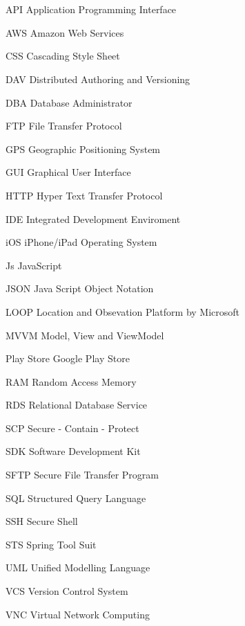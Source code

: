 \newpage
\chapter*{\abbreviationName}
\vspace{-0.3em}


\begin{abbrv}
\item[API]					Application Programming Interface
\item[AWS]					Amazon Web Services
\item[CSS]					Cascading Style Sheet
\item[DAV]					Distributed Authoring and Versioning
\item[DBA]					Database Administrator
\item[FTP]					File Transfer Protocol
\item[GPS]					Geographic Positioning System
\item[GUI]					Graphical User Interface
\item[HTTP]					Hyper Text Transfer Protocol
\item[IDE]					Integrated Development Enviroment
\item[iOS]					iPhone/iPad Operating System
\item[Js]					JavaScript
\item[JSON]					Java Script Object Notation
\item[LOOP]					Location and Obsevation Platform by Microsoft
\item[MVVM]                 Model, View and ViewModel
\item[Play Store]			Google Play Store
\item[RAM]				    Random Access Memory
\item[RDS]				    Relational Database Service
\item[SCP]                  Secure - Contain - Protect
\item[SDK]                  Software Development Kit
\item[SFTP]                 Secure File Transfer Program
\item[SQL]                  Structured Query Language
\item[SSH]                  Secure Shell
\item[STS]                  Spring Tool Suit
\item[UML]                  Unified Modelling Language
\item[VCS]					Version Control System
\item[VNC]					Virtual Network Computing
\end{abbrv}